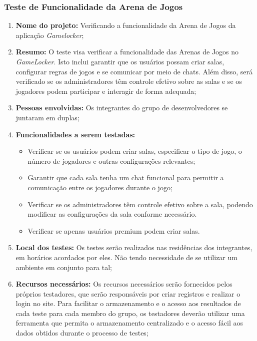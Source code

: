 \subsubsection{Teste de Funcionalidade da Arena de Jogos}
\begin{enumerate}

\item{\textbf{Nome do projeto:}}
Verificando a funcionalidade da Arena de Jogos da aplicação \textit{Gamelocker};

\item{\textbf{Resumo:}}
O teste visa verificar a funcionalidade das Arenas de Jogos no \textit{GameLocker}. Isto inclui garantir que os usuários possam criar salas, configurar regras de jogos e se comunicar por meio de chats. Além disso, será verificado se os administradores têm controle efetivo sobre as salas e se os jogadores podem participar e interagir de forma adequada;

\item{\textbf{Pessoas envolvidas:}}
Os integrantes do grupo de desenvolvedores se juntaram em duplas;

\item{\textbf{Funcionalidades a serem testadas:}}
\begin{itemize}
\item Verificar se os usuários podem criar salas, especificar o tipo de jogo, o número de jogadores e outras configurações relevantes;
\item Garantir que cada sala tenha um chat funcional para permitir a comunicação entre os jogadores durante o jogo;
\item Verificar se os administradores têm controle efetivo sobre a sala, podendo modificar as configurações da sala conforme necessário.
\item Verificar se apenas usuários premium podem criar salas.
\end{itemize}

\item{\textbf{Local dos testes:}}
Os testes serão realizados nas residências dos integrantes, em horários acordados por eles. Não tendo necessidade de se utilizar um ambiente em conjunto para tal;

\item{\textbf{Recursos necessários:}}
Os recursos necessários serão fornecidos pelos próprios testadores, que serão responsáveis por criar registros e realizar o login no site. Para facilitar o armazenamento e o acesso aos resultados de cada teste para cada membro do grupo, os testadores deverão utilizar uma ferramenta que permita o armazenamento centralizado e o acesso fácil aos dados obtidos durante o processo de testes;


\end{enumerate}
